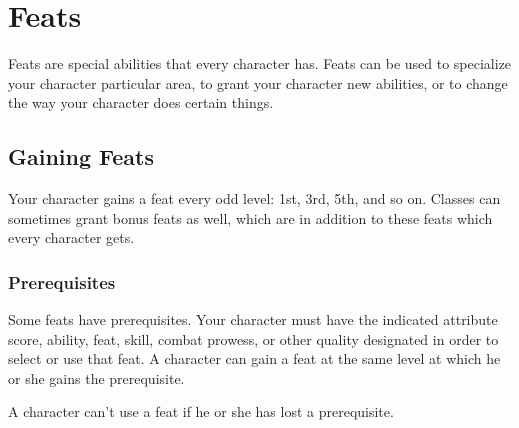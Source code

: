 \chapter{Feats}\label{Feats}

Feats are special abilities that every character has.
Feats can be used to specialize your character particular area, to grant your character new abilities, or to change the way your character does certain things.

\section{Gaining Feats}
Your character gains a feat every odd level: 1st, 3rd, 5th, and so on.
Classes can sometimes grant bonus feats as well, which are in addition to these feats which every character gets.

\subsection{Prerequisites}
Some feats have prerequisites.
Your character must have the indicated attribute score, ability, feat, skill, combat prowess, or other quality designated in order to select or use that feat.
A character can gain a feat at the same level at which he or she gains the prerequisite.

A character can't use a feat if he or she has lost a prerequisite.

